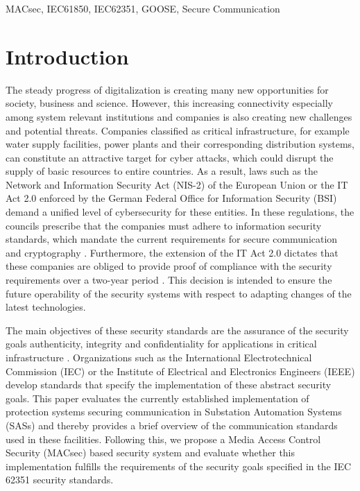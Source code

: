 \documentclass[conference, onecolumn, a4paper]{IEEEtran}
\begin{document}
\vspace{6 pt}

\begin{IEEEkeywords}
    MACsec, IEC61850, IEC62351, GOOSE, Secure Communication
\end{IEEEkeywords}

\section{Introduction}
\label{chapter:introduction}
\noindent The steady progress of digitalization is creating many new opportunities for society, business and science. However, this increasing connectivity 
especially among system relevant institutions and companies is also creating new challenges and potential threats. Companies classified as critical infrastructure, 
for example water supply facilities, power plants and their corresponding distribution systems, can constitute an attractive target for cyber attacks, 
which could disrupt the supply of basic resources to entire countries. As a result, laws such as the Network and Information Security Act (NIS-2) 
\cite{NIS-2:2022} of the European Union or the IT Act 2.0 \cite{IT-Gesetz_2:2021} enforced by the German Federal Office for Information Security (BSI) 
demand a unified level of cybersecurity for these entities. In these regulations, the councils prescribe that the companies must adhere to information 
security standards, which mandate the current requirements for secure communication and cryptography \cite[p. 9]{BSI-ISMS:2017}. Furthermore, the 
extension of the IT Act 2.0 dictates that these companies are obliged to provide proof of compliance with the security requirements over a two-year 
period \cite[§11 (1e)]{IT-Gesetz_2:2021}. This decision is intended to ensure the future operability of the security systems with respect to adapting 
changes of the latest technologies. 

\smallskip
The main objectives of these security standards are the assurance of the security goals authenticity, integrity and confidentiality for applications in 
critical infrastructure \cite[§2 (13)]{IT-Gesetz_2:2021}. Organizations such as the International Electrotechnical Commission (IEC) or the Institute of 
Electrical and Electronics Engineers (IEEE) develop standards that specify the implementation of these abstract security goals. This paper evaluates the 
currently established implementation of protection systems securing communication in Substation Automation Systems (SASs) and thereby provides a brief 
overview of the communication standards used in these facilities. Following this, we propose a Media Access Control Security (MACsec) based security system 
and evaluate whether this implementation fulfills the requirements of the security goals specified in the IEC 62351 security standards. 
\end{document}
